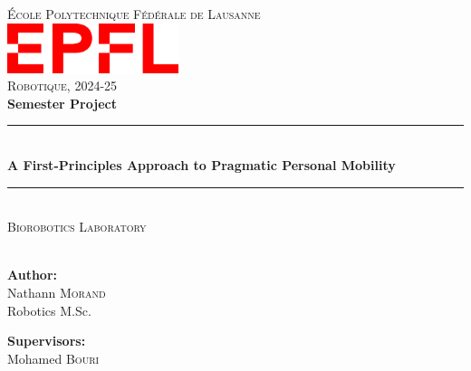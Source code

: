 \documentclass[a4paper, 11 pt]{article}
\begin{document}
\thispagestyle{empty}
\begin{center}
    \newcommand{\HRule}{\rule{\linewidth}{0.5mm}}
    
    \textsc{\LARGE École Polytechnique Fédérale de Lausanne}\\[0.5cm]
    \includegraphics[width=5cm]{Figures/epfl_red.png}\\[0.5cm]
    \LARGE{\textsc{Robotique, 2024-25}}\\[0.5cm]
    \huge{\textbf{Semester Project}}
    
    \HRule \\[0.4cm]
    {\huge \bfseries A First-Principles Approach to Pragmatic Personal Mobility}\\[0.1cm]
    \HRule \\[0.5cm]
    \LARGE{\textsc{Biorobotics Laboratory} \\
    }\\[0.5cm]
    
    \vspace{5mm}
    \vspace{15mm}
    
    \begin{minipage}{2in} \Large
    \textbf{Author:}\\
    Nathann \textsc{Morand}\\
    Robotics M.Sc.
    \end{minipage}
    \hfill
    \begin{minipage}{2.1in} \Large
    \textbf{Supervisors:}\\
    Mohamed \textsc{Bouri} \\
    \end{minipage}
\end{center}

\newpage
\renewcommand{\contentsname}{Table of Contents} 
{
  \hypersetup{linkcolor=black}
  \tableofcontents
}
\newpage
\end{document}
